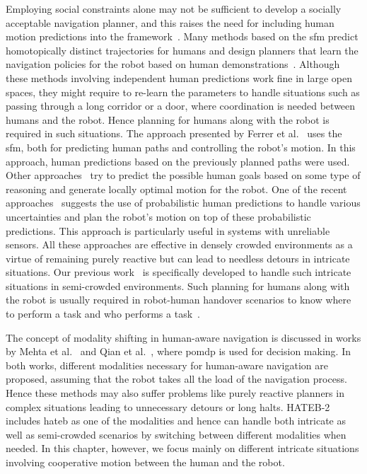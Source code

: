 Employing social constraints alone may not be sufficient to develop a socially acceptable navigation planner, and this raises the need for including human motion predictions into the framework~\cite{kuderer_rss_2012}. Many methods based on the \acrshort{sfm} predict homotopically distinct trajectories for humans and design planners that learn the navigation policies for the robot based on human demonstrations~\cite{kuderer_rss_2012}. Although these methods involving independent human predictions work fine in large open spaces, they might require to re-learn the parameters to handle situations such as passing through a long corridor or a door, where coordination is needed between humans and the robot. Hence planning for humans along with the robot is required in such situations. The approach presented by Ferrer et al.~\cite{ferrer2015multi} uses the \acrshort{sfm}, both for predicting human paths and controlling the robot's motion. In this approach, human predictions based on the previously planned paths were used. Other approaches~\cite{bordallo_iros_2015, nagariya_cdc_2015} try to predict the possible human goals based on some type of reasoning and generate locally optimal motion for the robot. One of the recent approaches~\cite{fisac2018probabilistically} suggests the use of probabilistic human predictions to handle various uncertainties and plan the robot's motion on top of these probabilistic predictions. This approach is particularly useful in systems with unreliable sensors. All these approaches are effective in densely crowded environments as a virtue of remaining purely reactive but can lead to needless detours in intricate situations. Our previous work~\cite{khambhaita2017viewing} is specifically developed to handle such intricate situations in semi-crowded environments. Such planning for humans along with the robot is usually required in robot-human handover scenarios to know where to perform a task and who performs a task~\cite{mainprice_ro-man_2012,waldhart_iros_2015}. 

The concept of modality shifting in human-aware navigation is discussed in works by Mehta et al.~\cite{mehta2016autonomous} and Qian et al.~\cite{qian2013decision}, where \acrshort{pomdp} is used for decision making. In both works, different modalities necessary for human-aware navigation are proposed, assuming that the robot takes all the load of the navigation process. Hence these methods may also suffer problems like purely reactive planners in complex situations leading to unnecessary detours or long halts. HATEB-2 includes \acrshort{hateb} as one of the modalities and hence can handle both intricate as well as semi-crowded scenarios by switching between different modalities when needed. In this chapter, however, we focus mainly on different intricate situations involving cooperative motion between the human and the robot. 


